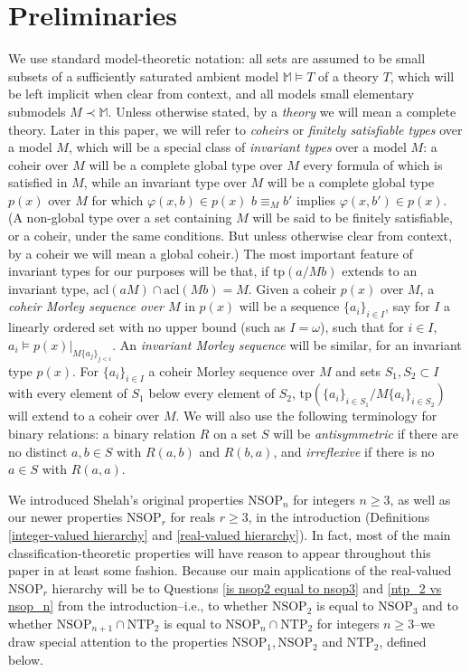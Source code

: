 \documentclass{amsart}
\theoremstyle{definition}
\theoremstyle{remark}
\numberwithin{equation}{section}
\begin{document}
\section{Preliminaries}\label{preliminaries}

We use standard model-theoretic notation: all sets are assumed to be small subsets of a sufficiently saturated ambient model $\mathbb{M} \models T$ of a theory $T$, which will be left implicit when clear from context, and all models small elementary submodels $M \prec \mathbb{M}$. Unless otherwise stated, by a \textit{theory} we will mean a complete theory. Later in this paper, we will refer to \textit{coheirs} or \textit{finitely satisfiable types} over a model $M$, which will be a special class of \textit{invariant types} over a model $M$: a coheir over $M$ will be a complete global type over $M$ every formula of which is satisfied in $M$, while an invariant type over $M$ will be a complete global type $p(x)$ over $M$ for which $\varphi(x, b) \in p(x)$ $b\equiv_{M} b'$ implies $\varphi(x, b') \in p(x)$. (A non-global type over a set containing $M$ will be said to be finitely satisfiable, or a coheir, under the same conditions. But unless otherwise clear from context, by a coheir we will mean a global coheir.) The most important feature of invariant types for our purposes will be that, if $\mathrm{tp}(a/Mb)$ extends to an invariant type, $\mathrm{acl}(aM) \cap \mathrm{acl}(Mb) = M$. Given a coheir $p(x)$ over $M$, a  \textit{coheir Morley sequence over $M$} in $p(x)$ will be a sequence $\{a_{i}\}_{i \in I}$, say for $I$ a linearly ordered set with no upper bound (such as $I =\omega$), such that for $i \in I $, $a_{i} \models p(x)|_{M \{a_{j}\}_{j < i}}$. An \textit{invariant Morley sequence} will be similar, for an invariant type $p(x)$. For  $\{a_{i}\}_{i \in I}$ a coheir Morley sequence over $M$ and sets $S_{1}, S_{2} \subset I$ with every element of $S_{1}$ below every element of $S_{2}$, $\mathrm{tp}(\{a_{i}\}_{i \in S_{1}}/M\{a_{i}\}_{i \in S_{2}})$ will extend to a coheir over $M$. We will also use the following terminology for binary relations: a binary relation $R$ on a set $S$ will be \textit{antisymmetric} if there are no distinct $a, b \in S$ with $R(a, b)$ and $R(b,a)$, and \textit{irreflexive} if there is no $a \in S$ with $R(a, a)$. 


We introduced Shelah's original properties $\mathrm{NSOP}_{n}$ for integers $n \geq 3$, as well as our newer properties $\mathrm{NSOP}_{r}$ for reals $r \geq 3$, in the introduction (Definitions \ref{integer-valued hierarchy} and \ref{real-valued hierarchy}). In fact, most of the main classification-theoretic properties will have reason to appear throughout this paper in at least some fashion. Because our main applications of the real-valued $\mathrm{NSOP}_{r}$ hierarchy will be to Questions \ref{is nsop2 equal to nsop3} and \ref{ntp_2 vs nsop_n} from the introduction--i.e., to whether $\mathrm{NSOP}_{2}$ is equal to $\mathrm{NSOP}_{3}$ and to whether $\mathrm{NSOP}_{n+1} \cap \mathrm{NTP}_{2} $ is equal to $\mathrm{NSOP}_{n} \cap \mathrm{NTP}_{2} $ for integers $n \geq 3$--we draw special attention to the properties $\mathrm{NSOP}_{1}, \mathrm{NSOP}_{2}$ and $\mathrm{NTP}_{2}$, defined below.
\end{document}

